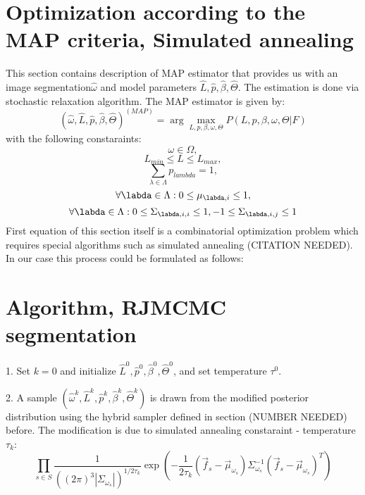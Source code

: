 \documentclass{article}
\begin{document}
{\section{Optimization according to the MAP criteria, Simulated annealing}
This section contains description of MAP estimator that provides us with an image segmentation$\widehat{\omega}$ and model parameters $\widehat{L},\widehat{p},\widehat{\beta},\widehat{\Theta}$. The estimation is done via stochastic relaxation algorithm. The MAP estimator is given by:
\begin{equation}
\left(\widehat{\omega},\widehat{L},\widehat{p},\widehat{\beta},\widehat{\Theta}\right)^{\left(MAP\right)} = 
\arg \max\limits_{L,p,\beta,\omega,\Theta}P\left(L,p,\beta,\omega,\Theta\left|\right.F\right) 
\end{equation}
with the following constaraints:
\begin{equation}
\omega \in \Omega,
\end{equation}
\begin{equation}
L_{min} \leq L \leq L_{max},
\end{equation}
\begin{equation}
\sum\limits_{\lambda\in\Lambda}p_{lambda} = 1,
\end{equation}
\begin{equation}
\forall\labda\in\Lambda : 0 \leq \mu_{\labda,i} \leq 1,
\end{equation}
\begin{equation}
\forall\labda\in\Lambda : 0 \leq \Sigma_{\labda,i,i} \leq 1, -1 \leq \Sigma_{\labda,i,j} \leq 1
\end{equation}
First equation of this section itself is a combinatorial optimization problem which requires special algorithms such as simulated annealing (CITATION NEEDED). In our case this process could be formulated as follows:

\section{Algorithm, RJMCMC segmentation}

1. Set $k=0$ and initialize $\widehat{L}^{0},\widehat{p}^{0},\widehat{\beta}^{0},\widehat{\Theta}^{0}$, and set temperature $\tau^{0}$.

2. A sample $\left(\widehat{\omega}^{k},\widehat{L}^{k},\widehat{p}^{k},\widehat{\beta}^{k},\widehat{\Theta}^{k}\right)$ is drawn from the modified posterior distribution using the hybrid sampler defined in section (NUMBER NEEDED) before. The modification is due to simulated annealing constaraint - temperature $\tau_{k}$:
\begin{equation}
\prod\limits_{s\in S}
\frac{1}
{\left(\left(2\pi\right)^{3}
\left|\Sigma_{\omega_{s}}\right|\right)^{1/2\tau_{k}}
}
\exp{
\left(
-\frac{1}{2\tau_{k}}
\left(\vec{f}_{s}-\vec{\mu}_{\omega_{s}}\right)
\Sigma_{\omega_{s}}^{-1}\left(\vec{f}_{s}-\vec{\mu}_{\omega_{s}}\right)^{T}
\right)

}
\end{equation}}
\end{document}
